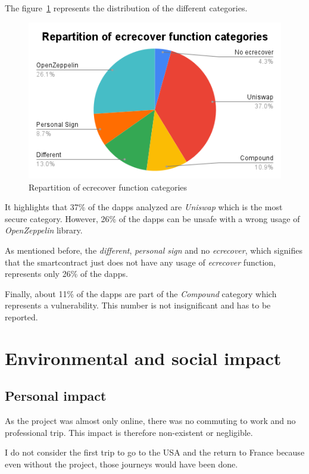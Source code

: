 \documentclass{iitFirstPage}
\begin{document}
    The figure~\ref{fig:repartition-ecrecover} represents the distribution of the different categories.

    \begin{figure}[H]
        \centering
        \includegraphics[width=0.69 \linewidth]{ecrecover/repartition_categories}
        \caption{Repartition of ecrecover function categories}
        \label{fig:repartition-ecrecover}
    \end{figure}

    It highlights that 37\% of the \Glspl{dapp} analyzed are \textit{Uniswap} which is the most secure category.
    However, 26\% of the \Glspl{dapp} can be unsafe with a wrong usage of \textit{OpenZeppelin} library.

    As mentioned before, the \textit{different}, \textit{personal sign} and no \textit{ecrecover}, which signifies that the \gls{smartcontract} just does not have any usage of \textit{ecrecover} function, represents only 26\% of the \Glspl{dapp}.

    Finally, about 11\% of the \Glspl{dapp} are part of the \textit{Compound} category which represents a vulnerability.
    This number is not insignificant and has to be reported.


    \section{Environmental and social impact}

    \subsection{Personal impact}

    As the project was almost only online, there was no commuting to work and no professional trip.
    This impact is therefore non-existent or negligible.

    I do not consider the first trip to go to the USA and the return to France because even without the project, those journeys would have been done.
\end{document}
